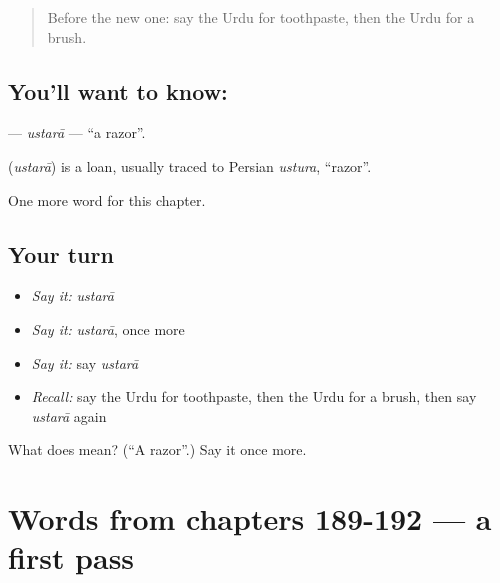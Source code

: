 \label{lesson:UR-C197-ustara}



\begin{quote}
Before the new one: say the Urdu for toothpaste, then the Urdu for a brush.
\end{quote}

\subsection*{You'll want to know: }
\textbf{} — \emph{ustarā} — \textquotedblleft{}a razor\textquotedblright{}.

\begin{cousinweb}
\textbf{} (\emph{ustarā}) is a loan, usually traced to Persian \emph{ustura}, \textquotedblleft{}razor\textquotedblright{}.
\end{cousinweb}

\begin{grammarlens}[title={What you've built}]
One more word for this chapter.
\end{grammarlens}

\subsection*{Your turn}
\begin{itemize}
\raggedright
  \item \emph{Say it:} \emph{ustarā}
  \item \emph{Say it:} \emph{ustarā}, once more
  \item \emph{Say it:} say \emph{ustarā}
  \item \emph{Recall:} say the Urdu for toothpaste, then the Urdu for a brush, then say \emph{ustarā} again
\end{itemize}

\begin{tcolorbox}[breakable,colback=teal!4,colframe=teal!35!black,title={Before you move on}]
What does  mean? (\textquotedblleft{}A razor\textquotedblright{}.) Say it once more.
\end{tcolorbox}
\section[(dialogue)]{Words from chapters 189-192 — a first pass}

\label{lesson:UR-R197-first-pass-words-from-chapters-189-192}



